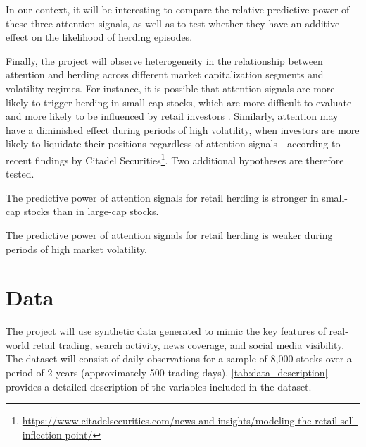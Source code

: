 \documentclass[12pt]{article}
\begin{document}
In our context, it will be interesting to compare the relative predictive power of
these three attention signals, as well as to test whether they have an additive
effect on the likelihood of herding episodes.

Finally, the project will observe heterogeneity in the relationship between attention
and herding across different market capitalization segments and volatility regimes. For
instance, it is possible that attention signals are more likely to trigger herding
in small-cap stocks, which are more difficult to evaluate and more likely to be influenced
by retail investors \parencite{BarberOdean2008}. Similarly, attention may have a diminished
effect during periods of high volatility, when investors are more likely to liquidate their
positions regardless of attention signals---according to recent findings by Citadel Securities\footnote{
  \url{https://www.citadelsecurities.com/news-and-insights/modeling-the-retail-sell-inflection-point/}
}. Two additional hypotheses are therefore tested.

\begin{tcolorbox}[colback=blue!5!white, colframe=blue!75!black, title=Hypothesis 4]
  The predictive power of attention signals for retail herding is stronger in small-cap stocks than in large-cap stocks.
\end{tcolorbox}

\begin{tcolorbox}[colback=blue!5!white, colframe=blue!75!black, title=Hypothesis 5]
  The predictive power of attention signals for retail herding is weaker during periods of high market volatility.
\end{tcolorbox}

\section{Data}

The project will use synthetic data generated to mimic the key features of real-world retail
trading, search activity, news coverage, and social media visibility. The dataset will
consist of daily observations for a sample of 8,000 stocks over a period of 2 years (approximately
500 trading days). \autoref{tab:data_description} provides a detailed description of
the variables included in the dataset.
\end{document}

